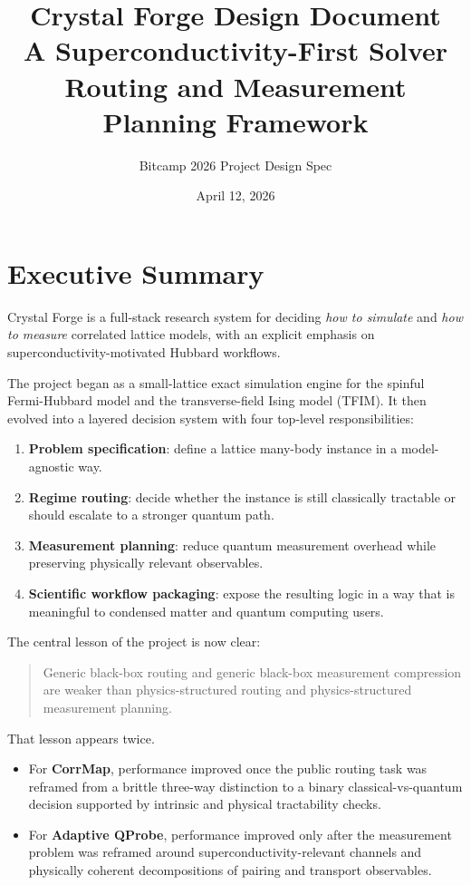 \documentclass[11pt]{article}
\title{Crystal Forge Design Document\\
\large A Superconductivity-First Solver Routing and Measurement Planning Framework}
\author{Bitcamp 2026 Project Design Spec}
\date{April 12, 2026}
\begin{document}
\maketitle
\tableofcontents
\newpage

\section{Executive Summary}

Crystal Forge is a full-stack research system for deciding \emph{how to simulate} and \emph{how to measure} correlated lattice models, with an explicit emphasis on superconductivity-motivated Hubbard workflows.

The project began as a small-lattice exact simulation engine for the spinful Fermi-Hubbard model and the transverse-field Ising model (TFIM). It then evolved into a layered decision system with four top-level responsibilities:

\begin{enumerate}[label=\arabic*.]
\item \textbf{Problem specification}: define a lattice many-body instance in a model-agnostic way.
\item \textbf{Regime routing}: decide whether the instance is still classically tractable or should escalate to a stronger quantum path.
\item \textbf{Measurement planning}: reduce quantum measurement overhead while preserving physically relevant observables.
\item \textbf{Scientific workflow packaging}: expose the resulting logic in a way that is meaningful to condensed matter and quantum computing users.
\end{enumerate}

The central lesson of the project is now clear:

\begin{quote}
Generic black-box routing and generic black-box measurement compression are weaker than physics-structured routing and physics-structured measurement planning.
\end{quote}

That lesson appears twice.

\begin{itemize}
\item For \textbf{CorrMap}, performance improved once the public routing task was reframed from a brittle three-way distinction to a binary classical-vs-quantum decision supported by intrinsic and physical tractability checks.
\item For \textbf{Adaptive QProbe}, performance improved only after the measurement problem was reframed around superconductivity-relevant channels and physically coherent decompositions of pairing and transport observables.
\end{itemize}
\end{document}
